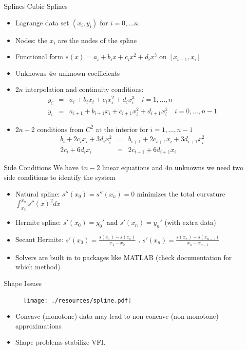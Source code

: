 \documentclass[11pt,handout,xcolor=pdftex,dvipsnames,table,mathserif,aspectratio=169]{beamer}
\begin{document}
\begin{frame}{Splines}
Cubic Splines
\begin{itemize}
\item Lagrange data set $(x_i,y_i)$ for $i=0,\ldots n$.
\item Nodes: the $x_i$ are the nodes of the spline
\item Functional form $s(x) = a_i + b_i x + c_i x^2 + d_i x^3$ on $[x_{i-1},x_i]$
\item Unknowns $4n$ unknown coefficients
\item $2n$ interpolation and continuity conditions:
\begin{eqnarray*}
y_i &=& a_i + b_i x_i + c_i x_i^2 + d_i x_i^3 \quad i=1,\dots, n\\
y_i &=& a_{i+1} + b_{i+1} x_i + c_{i+1} x_i^2 + d_{i+1} x_i^3 \quad i=0,\ldots, n-1
\end{eqnarray*}
\item $2n - 2$ conditions from $C^2$ at the interior for $i=1,\ldots,n-1$
\begin{eqnarray*}
b_i + 2c_i x_i + 3 d_i x_i^2  &=& b_{i+1} + 2 c_{i+1} x_i + 3 d_{i+1}x_i^2\\ 
2c_i + 6d_i x_i &=& 2c_{i+1} + 6d_{i+1} x_i
\end{eqnarray*}
\end{itemize}
\end{frame}


\begin{frame}{Side Conditions}
We have $4n-2$ linear equations and $4n$ unknowns we need two side conditions to identify the system
\begin{itemize}
\item Natural spline: $s''(x_0) = s''(x_n) = 0$ minimizes the total curvature $\int_{x_0}^{x_n} s''(x)^2 dx$
\item Hermite spline: $s'(x_0) = y_0'$ and $s'(x_n) = y_n'$ (with extra data)
\item Secant Hermite: $s'(x_0) = \frac{s(x_1) - s(x_0)}{x_1-x_0}$ , $s'(x_n) = \frac{s(x_n) - s(x_{n-1})}{x_n-x_{n-1}}$
\item Solvers are built in to packages like MATLAB (check documentation for which method).
\end{itemize}
\end{frame}


\begin{frame}{Shape Issues}
\begin{figure}[htbp]
\begin{center}
\texttt{[image: ./resources/spline.pdf]}
\label{default}
\end{center}
\end{figure}
\begin{itemize}
\item Concave (monotone) data may lead to non concave (non monotone) approximations
\item Shape problems stabilize VFI.
\end{itemize}
\end{frame}
\end{document}
